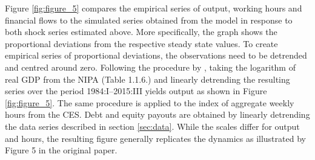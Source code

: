 Figure \ref{fig:figure_5} compares the empirical series of output, working hours and financial flows to the simulated series obtained from the model in response to both shock series estimated above. More specifically, the graph shows the proportional deviations from the respective steady state values. To create empirical series of proportional deviations, the observations need to be detrended and centred around zero. Following the procedure by \citeauthor{JERMANNfinancial}, taking the logarithm of real GDP from the NIPA (Table 1.1.6.) and linearly detrending the resulting series over the period 1984:I--2015:III yields output as shown in Figure \ref{fig:figure_5}. The same procedure is applied to the index of aggregate weekly hours from the CES. Debt and equity payouts are obtained by linearly detrending the data series described in section \ref{sec:data}. While the scales differ for output and hours, the resulting figure generally replicates the dynamics as illustrated by Figure 5 in the original paper.
